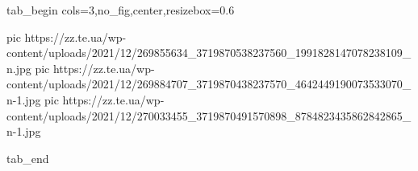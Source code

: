  
 
 
 
 

\ifcmt
  tab_begin cols=3,no_fig,center,resizebox=0.6

     pic https://zz.te.ua/wp-content/uploads/2021/12/269855634_3719870538237560_1991828147078238109_n.jpg
		 pic https://zz.te.ua/wp-content/uploads/2021/12/269884707_3719870438237570_4642449190073533070_n-1.jpg
		 pic https://zz.te.ua/wp-content/uploads/2021/12/270033455_3719870491570898_8784823435862842865_n-1.jpg

  tab_end
\fi
